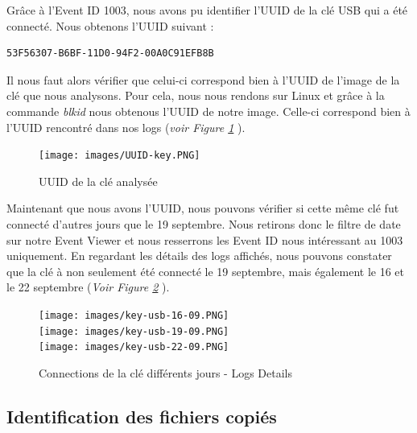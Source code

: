 \documentclass[a4paper]{article}
\begin{document}
Grâce à l'Event ID 1003, nous avons pu identifier l'UUID de la clé USB qui a été connecté. Nous obtenons l'UUID suivant :
\begin{example}
\begin{Verbatim}[fontsize=\small]
    53F56307-B6BF-11D0-94F2-00A0C91EFB8B
\end{Verbatim}
\end{example}
Il nous faut alors vérifier que celui-ci correspond bien à l'UUID de l'image de la clé que nous analysons. Pour cela, nous nous rendons sur Linux et grâce à la commande \emph{blkid} nous obtenous l'UUID de notre image. Celle-ci correspond bien à l'UUID rencontré dans nos logs (\emph{voir Figure \ref{key_analysis}} ).

\begin{figure}[H]
    \centering
    \texttt{[image: images/UUID-key.PNG]}
    \caption{UUID de la clé analysée}
    \label{key_analysis}
\end{figure}

Maintenant que nous avons l'UUID, nous pouvons vérifier si cette même clé fut connecté d'autres jours que le 19 septembre. Nous retirons donc le filtre de date sur notre Event Viewer et nous resserrons les Event ID nous intéressant au 1003 uniquement. En regardant les détails des logs affichés, nous pouvons constater que la clé à non seulement été connecté le 19 septembre, mais également le 16 et le 22 septembre (\emph{Voir Figure \ref{differents_days}} ).

\begin{figure}[H]
    \centering
    \texttt{[image: images/key-usb-16-09.PNG]}\\
    \texttt{[image: images/key-usb-19-09.PNG]}\\
    \texttt{[image: images/key-usb-22-09.PNG]}\\
    \caption{Connections de la clé différents jours - Logs Details}
    \label{differents_days}
\end{figure}





\subsection{Identification des fichiers copiés}
\end{document}
